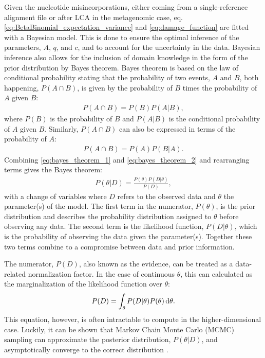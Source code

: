 Given the nucleotide misincorporations, either coming from a single-reference alignment file or after LCA in the metagenomic case, eq. \eqref{eq:BetaBinomial_expectation_variance} and \eqref{eq:damage_function} are fitted with a Bayesian model. This is done to ensure the optimal inference of the parameters, $A$, $q$, and $c$, and to account for the uncertainty in the data. Bayesian inference also allows for the inclusion of domain knowledge in the form of the prior distribution by Bayes theorem. Bayes theorem is based on the law of conditional probability \autocite{barlowStatisticsGuideUse1993} stating that the probability of two events, $A$ and $B$, both happening, $P(A \cap B)$, is given by the probability of $B$ times the probability of $A$ given $B$:
\begin{align}
    P(A \cap B) = P(B)P(A|B),
    \label{eq:bayes_theorem_1}
\end{align}
where $P(B)$ is the probability of $B$ and $P(A|B)$ is the conditional probability of $A$ given $B$. Similarly, $P(A \cap B)$ can also be expressed in terms of the probability of $A$:
\begin{align}
    P(A \cap B) = P(A)P(B|A).
    \label{eq:bayes_theorem_2}
\end{align}
Combining \autoref{eq:bayes_theorem_1} and \autoref{eq:bayes_theorem_2} and rearranging terms gives the Bayes theorem:
\begin{align}
    P(\theta|D) = \frac{P(\theta)P(D|\theta)}{P(D)},
    \label{eq:bayes_theorem}
\end{align}
with a change of variables where $D$ refers to the observed data and $\theta$ the parameter(s) of the model. The first term in the numerator, $P(\theta)$, is the prior distribution and describes the probability distribution assigned to $\theta$ before observing any data. The second term is the likelihood function, $P(D|\theta)$, which is the probability of observing the data given the parameter(s). Together these two terms combine to a compromise between data and prior information.

The numerator, $P(D)$, also known as the evidence, can be treated as a data-related normalization factor. In the case of continuous $\theta$, this can calculated as the marginalization of the likelihood function over $\theta$:
\begin{align}
    P(D) = \int_\theta P(D|\theta)P(\theta) \mathop{}\!\mathrm{d} \theta.
    \label{eq:evidence}
\end{align}
This equation, however, is often intractable to compute in the higher-dimensional case. Luckily, it can be shown that Markov Chain Monte Carlo (MCMC) sampling can approximate the posterior distribution, $P(\theta|D)$, and asymptotically converge to the correct distribution \autocite{gelmanBayesianDataAnalysis2015a}.

